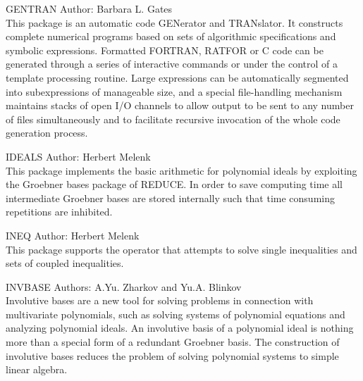 \begin{Package}{GENTRAN}
Author: Barbara L. Gates\\

This package is an automatic code GENerator and TRANslator.  It constructs
complete numerical programs based on sets of algorithmic specifications and
symbolic expressions.  Formatted FORTRAN, RATFOR or C code can be generated
through a series of interactive commands or under the control of a template
processing routine.  Large expressions can be automatically segmented into
subexpressions of manageable size, and a special file-handling mechanism
maintains stacks of open I/O channels to allow output to be sent to any
number of files simultaneously and to facilitate recursive invocation of the
whole code generation process.
\end{Package}

\begin{Package}{IDEALS}
Author: Herbert Melenk\\

This package implements the basic arithmetic for polynomial ideals by
exploiting the Groebner bases package of REDUCE.  In order to save
computing time all intermediate Groebner bases are stored internally such
that time consuming repetitions are inhibited.
\end{Package}

\begin{Package}{INEQ}
Author: Herbert Melenk\\

This package supports the operator  that
attempts to solve single inequalities and sets of coupled inequalities.
\end{Package}

\begin{Package}{INVBASE}
Authors: A.Yu. Zharkov and Yu.A. Blinkov\\

Involutive bases are a new tool for solving problems in connection with
multivariate polynomials, such as solving systems of polynomial equations
and analyzing polynomial ideals.  An involutive basis of a polynomial ideal
is nothing more than a special form of a redundant Groebner basis.  The
construction of involutive bases reduces the problem of solving polynomial
systems to simple linear algebra.
\end{Package}

